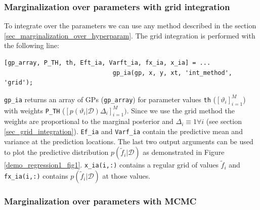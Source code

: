 \documentclass[twoside,11pt]{article}
\newcommand{\code}[1]{{\normalfont\texttt{#1}}}
\begin{document}
\subsubsection{Marginalization over parameters with grid integration}

To integrate over the parameters we can use any method
described in the section \ref{sec_marginalization_over_hyperparam}.
The grid integration is performed with the following line:
%
\begin{verbatim}
[gp_array, P_TH, th, Eft_ia, Varft_ia, fx_ia, x_ia] = ...
                              gp_ia(gp, x, y, xt, 'int_method', 'grid');
\end{verbatim}
%
\code{gp\_ia} returns an array of GPs (\code{gp\_array}) for parameter
values \code{th} ($[\vartheta_i]_{i=1}^M$) with weights \code{P\_TH}
($[p(\vartheta_i|\mathcal{D}) \Delta_i]_{i=1}^M)$. Since we use the
grid method the weights are proportional to the marginal posterior and
$\Delta_i \equiv 1 \forall i$ (see section
\ref{sec_grid_integration}).  \code{Ef\_ia} and \code{Varf\_ia}
contain the predictive mean and variance at the prediction locations.
The last two output arguments can be used to plot the predictive
distribution $p(\tilde{f}_i|\mathcal{D})$ as demonstrated in Figure
\ref{demo_regression1_fig1}.  \code{x\_ia(i,:)} contains a regular
grid of values $\tilde{f}_i$ and \code{fx\_ia(i,:)} contains
$p(\tilde{f}_i|\mathcal{D})$ at those values.


\subsubsection{Marginalization over parameters with MCMC}
\end{document}
